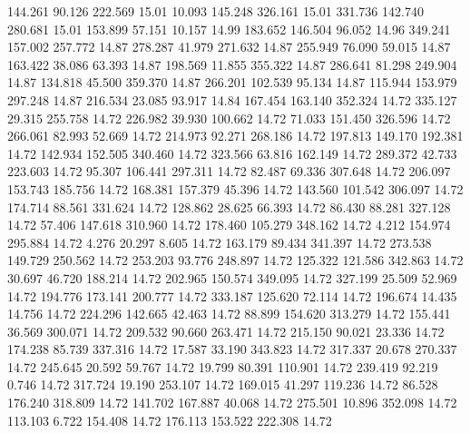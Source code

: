  144.261   90.126  222.569        15.01
  10.093  145.248  326.161        15.01
 331.736  142.740  280.681        15.01
 153.899   57.151   10.157        14.99
 183.652  146.504   96.052        14.96
 349.241  157.002  257.772        14.87
 278.287   41.979  271.632        14.87
 255.949   76.090   59.015        14.87
 163.422   38.086   63.393        14.87
 198.569   11.855  355.322        14.87
 286.641   81.298  249.904        14.87
 134.818   45.500  359.370        14.87
 266.201  102.539   95.134        14.87
 115.944  153.979  297.248        14.87
 216.534   23.085   93.917        14.84
 167.454  163.140  352.324        14.72
 335.127   29.315  255.758        14.72
 226.982   39.930  100.662        14.72
  71.033  151.450  326.596        14.72
 266.061   82.993   52.669        14.72
 214.973   92.271  268.186        14.72
 197.813  149.170  192.381        14.72
 142.934  152.505  340.460        14.72
 323.566   63.816  162.149        14.72
 289.372   42.733  223.603        14.72
  95.307  106.441  297.311        14.72
  82.487   69.336  307.648        14.72
 206.097  153.743  185.756        14.72
 168.381  157.379   45.396        14.72
 143.560  101.542  306.097        14.72
 174.714   88.561  331.624        14.72
 128.862   28.625   66.393        14.72
  86.430   88.281  327.128        14.72
  57.406  147.618  310.960        14.72
 178.460  105.279  348.162        14.72
   4.212  154.974  295.884        14.72
   4.276   20.297    8.605        14.72
 163.179   89.434  341.397        14.72
 273.538  149.729  250.562        14.72
 253.203   93.776  248.897        14.72
 125.322  121.586  342.863        14.72
  30.697   46.720  188.214        14.72
 202.965  150.574  349.095        14.72
 327.199   25.509   52.969        14.72
 194.776  173.141  200.777        14.72
 333.187  125.620   72.114        14.72
 196.674   14.435   14.756        14.72
 224.296  142.665   42.463        14.72
  88.899  154.620  313.279        14.72
 155.441   36.569  300.071        14.72
 209.532   90.660  263.471        14.72
 215.150   90.021   23.336        14.72
 174.238   85.739  337.316        14.72
  17.587   33.190  343.823        14.72
 317.337   20.678  270.337        14.72
 245.645   20.592   59.767        14.72
  19.799   80.391  110.901        14.72
 239.419   92.219    0.746        14.72
 317.724   19.190  253.107        14.72
 169.015   41.297  119.236        14.72
  86.528  176.240  318.809        14.72
 141.702  167.887   40.068        14.72
 275.501   10.896  352.098        14.72
 113.103    6.722  154.408        14.72
 176.113  153.522  222.308        14.72
